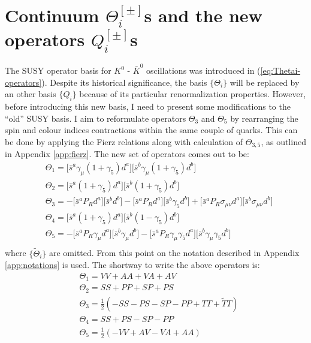 \documentclass[english, LaM, oneside, noexaminfo]{sapthesis}
\newcommand{\kkb}{$K^0$ - $\bar K^0$ }
\begin{document}
\section{Continuum $\Theta_i^{[\pm]}$s and the new operators $Q_i^{[\pm]}$s}
\noindent
The SUSY operator basis for \kkb oscillations was introduced in (\ref{eq:Thetai-operators}).
Despite its historical significance, the basis $\{\Theta_i\}$ will be replaced by an other basis $\{Q_i\}$ because of its particular renormalization properties.
However, before introducing this new basis, I need to present some modifications to the ``old'' SUSY basis.
\newline
I aim to reformulate operators $\Theta_3$ and $\Theta_5$ by rearranging the spin and colour indices contractions within the same couple of quarks. 
This can be done by applying the Fierz relations \cite{Itzykson-Zuber} along with calculation of $\Theta_{3,5}$, as outlined in Appendix \ref{app:fierz}.
The new set of operators comes out to be:
\begin{equation*}
    \begin{aligned}
        & \Theta_1 = \Big[\bar s^a \gamma_\mu (1+\gamma_5) d^a \Big]\Big[ \bar s^b \gamma_\mu (1+\gamma_5) d^b \Big] \\
        & \Theta_2 = \Big[\bar s^a  (1+\gamma_5) d^a \Big]\Big[ \bar s^b (1+\gamma_5) d^b \Big] \\
        & \Theta_3 = -\Big[\bar s^a  P_R d^a \Big]\Big[ \bar s^b d^b \Big] - \Big[\bar s^a P_R d^a \Big]\Big[ \bar s^b \gamma_5 d^b \Big] + \Big[\bar s^a P_R \sigma_{\mu\nu} d^a \Big]\Big[ \bar s^b \sigma_{\mu\nu} d^b \Big] \\ 
        & \Theta_4 = \Big[\bar s^a  (1+\gamma_5) d^a \Big]\Big[ \bar s^b (1-\gamma_5) d^b \Big] \\
        & \Theta_5 = -\Big[\bar s^a  P_R\gamma_\mu d^a \Big]\Big[ \bar s^b \gamma_\mu d^b \Big] - \Big[\bar s^a P_R \gamma_\mu \gamma_5 d^a \Big]\Big[ \bar s^b \gamma_\mu\gamma_5 d^b \Big] \\
     \end{aligned}
\end{equation*}
where $\{\tilde\Theta_i\}$ are omitted.
From this point on the notation described in Appendix \ref{app:notations} is used.
The shortway to write the above operators is:
\begin{equation*}
    \begin{aligned}
        & \Theta_1 = VV + AA +VA +AV \\
        & \Theta_2 = SS + PP + SP + PS \\
        & \Theta_3 = \frac{1}{2}\left( -SS-PS-SP-PP+TT+\tilde{T}T \right) \\
        & \Theta_4 = SS + PS - SP - PP \\
        & \Theta_5 = \frac{1}{2}\left(-VV+AV-VA+AA\right) \\
     \end{aligned}
\end{equation*}
\end{document}
